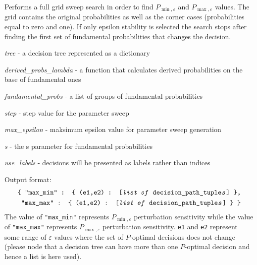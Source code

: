 \documentclass[a4paper,10pt,english]{sphinxmanual}
\begin{document}

\begin{fulllineitems}
	\label{index:chondro.find_perturbation_pessopty}
	Performs a full grid sweep search in order to find $P_{\min,\varepsilon}$ and $P_{\max,\varepsilon}$ values.
	The grid contains the original probabilities as well as the corner cases 
	(probabilities equal to zero and one).
	If only epsilon stability is selected the search stops after finding the
	first set of fundamental probabilities that changes the decision.
	
	\emph{tree} - a decision tree represented as a dictionary
	
	\emph{derived\_probs\_lambda} - a function that calculates derived probabilities     on the base of fundamental ones
	
	\emph{fundamental\_probs} - a list of groups of fundamental probabilities
	
	\emph{step} - step value for the parameter sweep
	
	\emph{max\_epsilon} - maksimum epsilon value for parameter sweep generation
	
	\emph{s} - the s parameter for fundamental probabilities
	
	\emph{use\_labels} - decisions will be presented as labels rather than indices
	
	Output format:	
	\begin{equation*}
		\begin{split}	
			\texttt{\{ }
			\texttt{"max\_min" : \{ (e1,e2) : [\textit{list of} decision\_path\_tuple\textit{s}] \},}\\
			\texttt{"max\_max" : \{ (e1,e2) : [\textit{list of} decision\_path\_tuple\textit{s}] \}}
			\texttt{ \}}				  
		\end{split}				
		\end{equation*}	
		 The value of \texttt{"max\_min"} represents $P_{\min,\varepsilon}$ perturbation sensitivity while the value of \texttt{"max\_max"} represents $P_{\max,\varepsilon}$ perturbation sensitivity. \texttt{e1} and \texttt{e2} represent some range of $\varepsilon$ values where the set of $P$-optimal decisions does not change (please node that a decision tree can have more than one $P$-optimal decision and hence a list is here used).
	
\end{fulllineitems}
\end{document}
